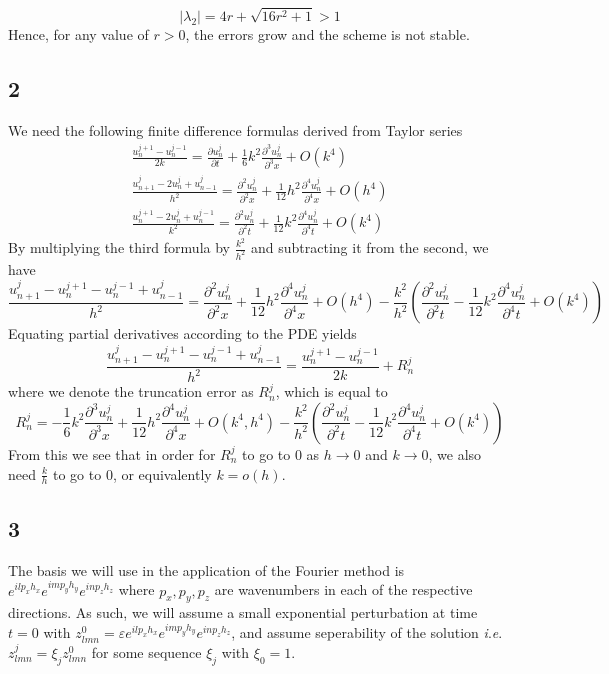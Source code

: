 \documentclass{article}
\numberwithin{equation}{section}
\theoremstyle{definition}
\newcommand{\ie}{\textit{i}.\textit{e}. }
\newcommand{\pp}[2]{\frac{\partial #1}{\partial #2}}
\newcommand{\ppn}[3]{\frac{\partial^{#1} #2}{\partial^{#1} #3}}
\newcommand{\eps}{\varepsilon}
\begin{document}
\begin{equation}
    |\lambda_2| = 4r+\sqrt{16r^{2}+1} > 1
\end{equation}
Hence, for any value of $r>0$, the errors grow and the scheme is not stable.

\subsection{2}
We need the following finite difference formulas derived from Taylor series
\begin{align}
    \label{eq:btaylor2}
    \frac{u_n^{j+1} - u_n^{j-1}}{2k} = \pp{u_n^j}{t} +\frac 16 k^2 \ppn{3}{u_n^j}{x} + O(k^4)\\
    \frac{u_{n+1}^j - 2u_n^j + u_{n-1}^j}{h^2} = \ppn{2}{u_n^j}{x} + \frac{1}{12} h^2 \ppn{4}{u_n^j}{x} + O(h^4) \\
    \frac{u_{n}^{j+1} - 2u_n^j + u_{n}^{j-1}}{k^2} = \ppn{2}{u_n^j}{t} + \frac{1}{12} k^2 \ppn{4}{u_n^j}{t} + O(k^4)
\end{align}
By multiplying the third formula by $\frac{k^2}{h^2}$ and subtracting it from the second, we have
\begin{equation}
    \frac{u_{n+1}^j - u_{n}^{j+1} - u_{n}^{j-1} + u_{n-1}^j}{h^2} = \ppn{2}{u_n^j}{x} + \frac{1}{12} h^2 \ppn{4}{u_n^j}{x} + O(h^4) - \frac{k^2}{h^2}\left(\ppn{2}{u_n^j}{t} - \frac{1}{12} k^2 \ppn{4}{u_n^j}{t} + O(k^4)\right)
\end{equation}
Equating partial derivatives according to the PDE yields
\begin{equation}
    \frac{u_{n+1}^j - u_{n}^{j+1} - u_{n}^{j-1} + u_{n-1}^j}{h^2} = \frac{u_n^{j+1} - u_n^{j-1}}{2k} + R_n^j
\end{equation}
where we denote the truncation error as $R_n^j$, which is equal to
\begin{equation}
    R_n^j = - \frac 16 k^2 \ppn{3}{u_n^j}{x} + \frac{1}{12} h^2 \ppn{4}{u_n^j}{x} + O(k^4, h^4) - \frac{k^2}{h^2}\left(\ppn{2}{u_n^j}{t} - \frac{1}{12} k^2 \ppn{4}{u_n^j}{t} + O(k^4)\right)
\end{equation}
From this we see that in order for $R_n^j$ to go to $0$ as $h \to 0$ and $k \to 0$, we also need $ \frac kh$ to go to $0$, or equivalently $k = o(h)$.

\subsection{3}
The basis we will use in the application of the Fourier method is $e^{ilp_x h_x}e^{imp_y h_y}e^{inp_z h_z}$ where $p_x, p_y, p_z$ are wavenumbers in each of the respective directions. As such, we will assume a small exponential perturbation at time $t=0$ with $z_{lmn}^0 = \eps e^{ilp_x h_x}e^{imp_y h_y}e^{inp_z h_z}$, and assume seperability of the solution \ie $z_{lmn}^j = \xi_j z_{lmn}^0$ for some sequence $\xi_j$ with $\xi_0 = 1$.
\end{document}
